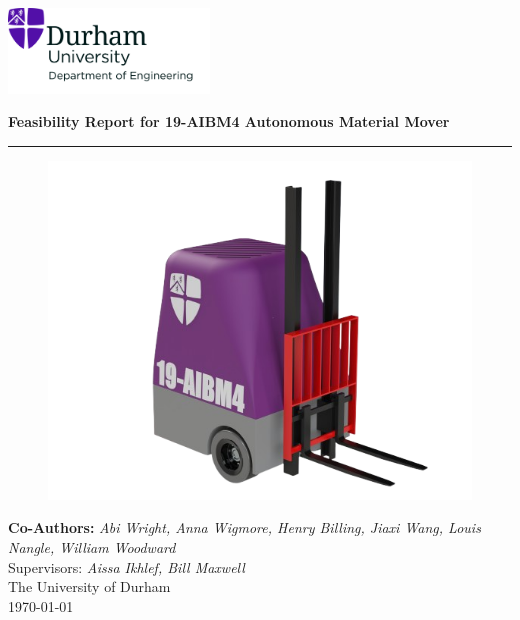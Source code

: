 \documentclass[12pt]{article}
\begin{document}


 
\begin{titlepage}
\centering
\includegraphics[width=0.4\textwidth]{UoD_Engineering.jpg} \\
\vspace{10mm}

{\LARGE \textbf{Feasibility Report for 19-AIBM4 Autonomous Material Mover}} \\[10pt]

\vspace{5mm}\hrule\vspace{0mm}

\begin{figure}[h!]
    \centering
     \includegraphics[width=1\textwidth]{Pooled_Design_V2__6_-removebg-preview.png}
\end{figure}  
\vspace{0mm}
\vspace{10mm}

{\large \textbf{Co-Authors: }\textit{Abi Wright, Anna Wigmore, Henry Billing, Jiaxi Wang, Louis Nangle, William Woodward}} \\ \vspace{1mm}
{Supervisors:\textit{ Aissa Ikhlef, Bill Maxwell}} \\[10pt]
{\small The University of Durham \\ \today}
\end{titlepage}
\end{document}
